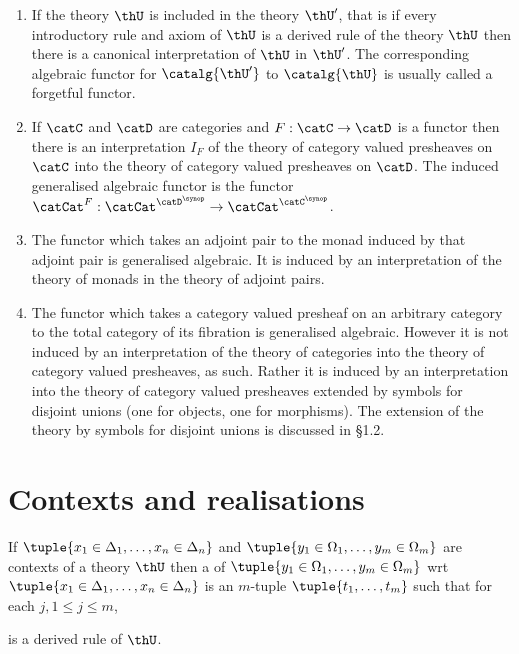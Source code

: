   \begin{examples}

    \begin{enumerate}
      \item If the theory $\thU$ is included in the theory $\thU'$, that is if every introductory rule and axiom of $\thU$ is a derived rule of the theory $\thU$ then there is a canonical interpretation of $\thU$ in $\thU'$.
        The corresponding algebraic functor for $\catalg{\thU'}$ to $\catalg{\thU}$ is usually called a forgetful functor.

      \item If $\catC$ and $\catD$ are categories and $F:\catC\to\catD$ is a functor then there is an interpretation $I_F$ of the theory of category valued presheaves on $\catC$ into the theory of category valued presheaves on $\catD$. The induced generalised algebraic functor is the functor $\catCat^F:\catCat^{\catD^\synop}\to\catCat^{\catC^\synop}$.

      \item The functor which takes an adjoint pair to the monad induced by that adjoint pair is generalised algebraic.
        It is induced by an interpretation of the theory of monads in the theory of adjoint pairs.

      \item The functor which takes a category valued presheaf on an arbitrary category to the total category of its fibration is generalised algebraic.
        However it is not induced by an interpretation of the theory of categories into the theory of category valued presheaves, as such.
        Rather it is induced by an interpretation into the theory of category valued presheaves extended by symbols for disjoint unions (one for objects, one for morphisms).
        The extension of the theory by symbols for disjoint unions is discussed in \S 1.2.
    \end{enumerate}
  \end{examples}

  \section{Contexts and realisations} \label{sec:source-1-12}

  \begin{definition}
    If $\tuple{x_1 \in \Delta_1, \dots, x_n \in \Delta_n}$ and $\tuple{y_1 \in \Omega_1, \dots, y_m \in \Omega_m}$ are contexts of a theory $\thU$ then a  of $\tuple{y_1 \in \Omega_1, \dots, y_m \in \Omega_m}$ wrt $\tuple{x_1 \in \Delta_1, \dots, x_n \in \Delta_n}$ is an $m$-tuple $\tuple{t_1, \dots, t_m}$ such that for each $j, 1 \le j \le m$,
    \begin{mathpar}
    \end{mathpar}
    is a derived rule of $\thU$.
  \end{definition}

